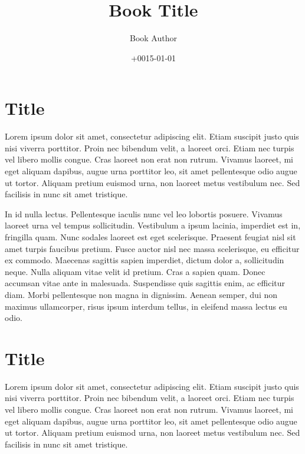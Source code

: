 \documentclass[
  a5paper,
  smalldemyvopaper,10pt,twoside,onecolumn,openright,extrafontsizes,hidelinks]{memoir}
\title{Book Title}
\author{Book Author}
\date{+0015-01-01}
\renewcommand*\contentsname{Table of contents}
\newcommand\contentsname{Table of contents}
\begin{document}
\frontmatter
\maketitle

\renewcommand*\contentsname{Contents}
{
\setcounter{tocdepth}{0}
\tableofcontents
}

\mainmatter
{}

\chapter{Title}\label{title}

Lorem ipsum dolor sit amet, consectetur adipiscing elit. Etiam suscipit
justo quis nisi viverra porttitor. Proin nec bibendum velit, a laoreet
orci. Etiam nec turpis vel libero mollis congue. Cras laoreet non erat
non rutrum. Vivamus laoreet, mi eget aliquam dapibus, augue urna
porttitor leo, sit amet pellentesque odio augue ut tortor. Aliquam
pretium euismod urna, non laoreet metus vestibulum nec. Sed facilisis in
nunc sit amet tristique.

In id nulla lectus. Pellentesque iaculis nunc vel leo lobortis posuere.
Vivamus laoreet urna vel tempus sollicitudin. Vestibulum a ipsum
lacinia, imperdiet est in, fringilla quam. Nunc sodales laoreet est eget
scelerisque. Praesent feugiat nisl sit amet turpis faucibus pretium.
Fusce auctor nisl nec massa scelerisque, eu efficitur ex commodo.
Maecenas sagittis sapien imperdiet, dictum dolor a, sollicitudin neque.
Nulla aliquam vitae velit id pretium. Cras a sapien quam. Donec accumsan
vitae ante in malesuada. Suspendisse quis sagittis enim, ac efficitur
diam. Morbi pellentesque non magna in dignissim. Aenean semper, dui non
maximus ullamcorper, risus ipsum interdum tellus, in eleifend massa
lectus eu odio.


\chapter{Title}\label{title-1}

Lorem ipsum dolor sit amet, consectetur adipiscing elit. Etiam suscipit
justo quis nisi viverra porttitor. Proin nec bibendum velit, a laoreet
orci. Etiam nec turpis vel libero mollis congue. Cras laoreet non erat
non rutrum. Vivamus laoreet, mi eget aliquam dapibus, augue urna
porttitor leo, sit amet pellentesque odio augue ut tortor. Aliquam
pretium euismod urna, non laoreet metus vestibulum nec. Sed facilisis in
nunc sit amet tristique.
\end{document}
